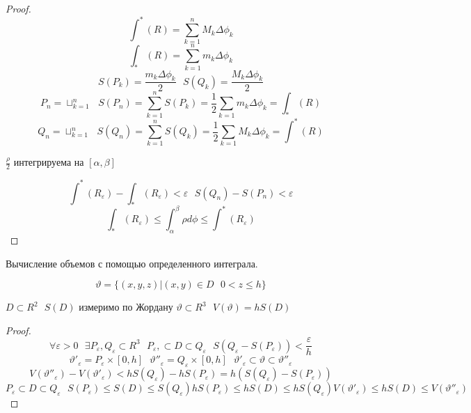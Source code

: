 \begin{proof}
  $$
  \int^* (R) = \sum_{k=1}^n M_k \Delta \phi_k
  $$
  $$
  \int_* (R) = \sum_{k=1}^n m_k \Delta \phi_k
  $$
  $$
  S(P_k) = \frac{m_k \Delta \phi_k}{2} ~~~
  S(Q_k) = \frac{M_k \Delta \phi_k}{2}
  $$
  $$
  P_n = \sqcup_{k=1}^n ~~~
  S(P_n) = \sum_{k=1}^n S(P_k) = \frac{1}{2} \sum_{k=1} m_k \Delta \phi_k =
  \int_* (R)
  $$
  $$
  Q_n = \sqcup_{k=1}^n ~~~
  S(Q_n) = \sum_{k=1}^n S(Q_k) = \frac{1}{2} \sum_{k=1} M_k \Delta \phi_k =
  \int^* (R)
  $$

  $\frac{\rho}{2}$ интегрируема на $[\alpha, \beta]$

  $$
  \int^* (R_{\varepsilon}) - \int_* (R_{\varepsilon}) < \varepsilon ~~~
  S(Q_n) - S(P_n) < \varepsilon
  $$
  $$
  \int_* (R_{\varepsilon}) \le \int_{\alpha}^{\beta} \rho d\phi \le
  \int^* (R_{\varepsilon})
  $$
\end{proof}

\begin{title}[\Large]
  Вычисление объемов с помощью определенного интеграла.
\end{title}

\begin{defin}[цилиндра]
  $$
  \vartheta = \{ (x,y,z) | (x,y) \in D ~~~ 0 < z \le h\}
  $$
\end{defin}

\begin{theorem}
  $D \subset R^2 ~~~ S(D)$ измеримо по Жордану $\vartheta \subset R^3 ~~~
  V(\vartheta) = h S(D)$
\end{theorem}

\begin{proof}
  $$
  \forall \varepsilon > 0 ~~~
  \exists P_{\varepsilon}, Q_{\varepsilon} \subset R^3 ~~~
  P_{\varepsilon}, \subset D \subset Q_{\varepsilon} ~~~
  S(Q_{\varepsilon} - S(P_{\varepsilon})) < \frac{\varepsilon}{h}
  $$
  $$
  \vartheta'_{\varepsilon} = P_{\varepsilon} \times [0,h] ~~~
  \vartheta''_{\varepsilon} = Q_{\varepsilon} \times [0,h] ~~~
  \vartheta'_{\varepsilon} \subset \vartheta \subset \vartheta''_{\varepsilon}
  $$
  $$
  V(\vartheta''_{\varepsilon}) - V(\vartheta'_{\varepsilon}) <
  h S(Q_{\varepsilon}) - h S(P_{\varepsilon}) =
  h (S(Q_{\varepsilon}) - S(P_{\varepsilon}))
  $$
  $$
  P_{\varepsilon} \subset D \subset Q_{\varepsilon} ~~~
  S(P_{\varepsilon}) \le S(D) \le S(Q_{\varepsilon})
  hS(P_{\varepsilon}) \le hS(D) \le hS(Q_{\varepsilon})
  V(\vartheta'_{\varepsilon}) \le h S(D) \le V(\vartheta''_{\varepsilon})
  $$
\end{proof}

